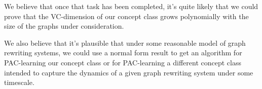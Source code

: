 \documentclass[]{article}
\begin{document}
We believe that once that task has been completed, it's quite likely
that we could prove that the VC-dimension of our concept class grows
polynomially with the size of the graphs under
consideration.

We also believe that it's plausible that under some reasonable model
of graph rewriting systems, we could use a normal form result to get
an algorithm for PAC-learning our concept class or for PAC-learning a
different concept class intended to capture the dynamics of a given
graph rewriting system under some timescale.



\end{document}
